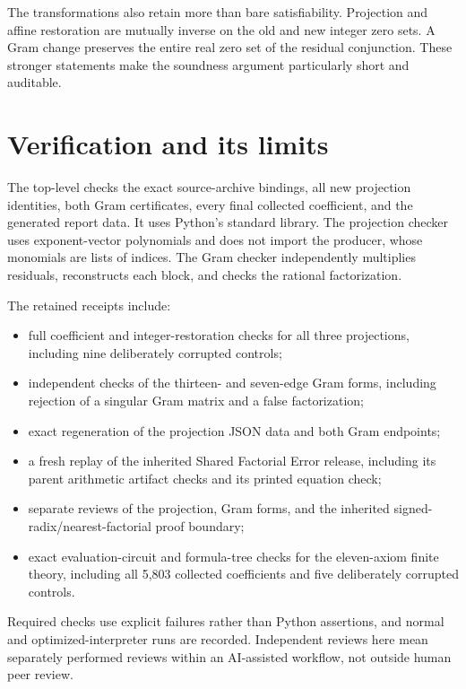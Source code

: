 \documentclass[11pt]{article}
\theoremstyle{remark}\newtheorem{remark}[theorem]{Remark}
\newcommand{\code}[1]{\texttt{\detokenize{#1}}}
\begin{document}
The transformations also retain more than bare satisfiability.
Projection and affine restoration are mutually inverse on the old
and new integer zero sets. A Gram change preserves the entire real
zero set of the residual conjunction. These stronger statements make
the soundness argument particularly short and auditable.

\section{Verification and its limits}\label{sec:verification}

The top-level \code{verify.py} checks the exact source-archive bindings,
all new projection identities, both Gram certificates, every final
collected coefficient, and the generated report data. It uses Python's
standard library. The projection checker uses exponent-vector
polynomials and does not import the producer, whose monomials are lists
of indices. The Gram checker independently multiplies residuals,
reconstructs each block, and checks the rational factorization.

The retained receipts include:
\begin{itemize}
\item full coefficient and integer-restoration checks for all three
      projections, including nine deliberately corrupted controls;
\item independent checks of the thirteen- and seven-edge Gram forms,
      including rejection of a singular Gram matrix and a false
      factorization;
\item exact regeneration of the projection JSON data and both Gram
      endpoints;
\item a fresh replay of the inherited Shared Factorial Error release,
      including its parent arithmetic artifact checks and its printed
      equation check;
\item separate reviews of the projection, Gram forms, and the
      inherited signed-radix/nearest-factorial proof boundary;
\item exact evaluation-circuit and formula-tree checks for the
      eleven-axiom finite theory, including all 5,803 collected
      coefficients and five deliberately corrupted controls.
\end{itemize}

Required checks use explicit failures rather than Python assertions, and
normal and optimized-interpreter runs are recorded. Independent reviews
here mean separately performed reviews within an AI-assisted workflow,
not outside human peer review.
\end{document}
